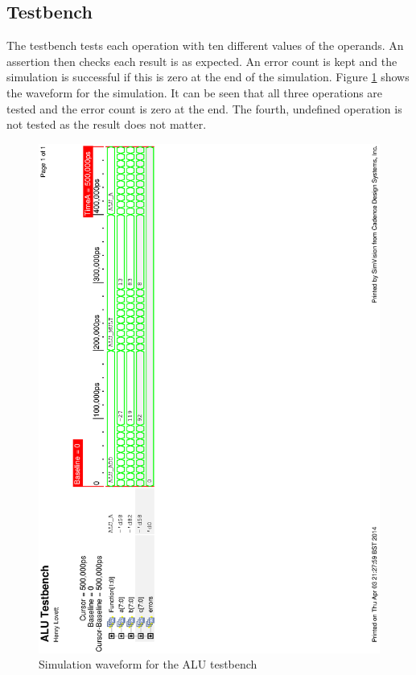 \subsection{Testbench}

The testbench tests each operation with ten different values of the operands. 
An assertion then checks each result is as expected. 
An error count is kept and the simulation is successful if this is zero at the end of the simulation.
Figure \ref{fig:alusim} shows the waveform for the simulation. 
It can be seen that all three operations are tested and the error count is zero at the end. 
The fourth, undefined operation is not tested as the result does not matter. 

\begin{figure}
\includegraphics[height=\textheight-1cm]{Figures/alusim.eps}
\caption{Simulation waveform for the ALU testbench}
\label{fig:alusim}
\end{figure}

